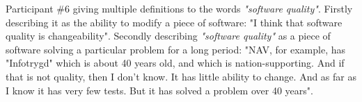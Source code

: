 Participant \#6 giving multiple definitions to the words \textit{"software quality"}. Firstly describing it as the ability to modify a piece of software: "I think that software quality is changeability". Secondly describing \textit{"software quality"} as a piece of software solving a particular problem for a long period: "NAV, for example, has "Infotrygd" which is about 40 years old, and which is nation-supporting. And if that is not quality, then I don't know. It has little ability to change. And as far as I know it has very few tests. But it has solved a problem over 40 years".





